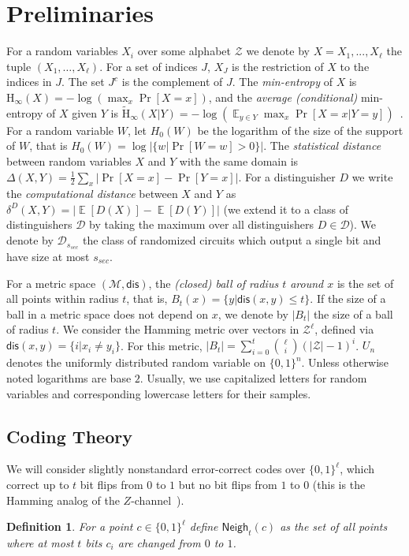 \documentclass[11pt]{article}
\DeclareMathOperator*{\expe}{\mathbb{E}}
\newcommand{\class}[1]{{\ensuremath{\mathsf{#1}}}}
\newcommand{\zo}{\ensuremath{\{0, 1\}}}
\newcommand{\neigh}{\ensuremath{\class{Neigh}}\xspace}
\newcommand{\dis}{\ensuremath{\mathsf{dis}}}
\newcommand{\Hoo}{\mathrm{H}_\infty}
\newcommand{\Hav}{\tilde{\mathrm{H}}_\infty}
\newtheorem{definition}[theorem]{Definition}
\begin{document}
\section{Preliminaries}
\label{sec:preliminaries}
For a random variables $X_i$ over some alphabet $\mathcal{Z}$ we denote by $X = X_1,..., X_\ell$  the tuple $(X_1,\dots, X_\ell)$.  For a set of indices $J$, $X_{J}$ is the restriction of $X$ to the indices in $J$.  The set $J^c$ is the complement of $J$.  The {\em min-entropy} of $X$ is $\Hoo(X) = -\log(\max_x \Pr[X=x])$,
and the {\em average (conditional)} min-entropy of $X$ given $Y$ is  $\Hav(X|Y) = -\log(\expe_{y\in Y} \max_{x} \Pr[X=x|Y=y])$~\cite[Section 2.4]{DBLP:journals/siamcomp/DodisORS08}.   For a random variable $W$, let $H_0(W)$ be the logarithm of the size of the support of $W$,  that is $H_0(W) = \log |\{w | \Pr[W=w]>0\}|$.
The {\em statistical distance} between random variables $X$ and $Y$ with the same domain is $\Delta(X,Y) = \frac12 \sum_x |\Pr[X=x] - \Pr[Y=x]|$.
For a distinguisher $D$ we write the \emph{computational distance} between $X$ and $Y$ as $\delta^D(X,Y) = \left| \expe[D(X)]-\expe[D(Y)]\right |$ (we extend it to a class of distinguishers $\mathcal{D}$ by taking the maximum over all distinguishers $D\in\mathcal{D}$).  We denote by $\mathcal{D}_{s_{sec}}$ the class of randomized circuits which output a single bit and have size at most $s_{sec}$.

For a metric space $(\mathcal{M}, \dis)$, the \emph{(closed) ball of radius $t$ around $x$} is the set of all points within radius $t$, that is, $B_t(x) = \{y| \dis(x, y)\leq t\}$.  If the size of a ball in a metric space does not depend on $x$, we denote by $|B_t|$ the size of a ball of radius $t$.  We consider the Hamming metric over vectors in $\mathcal{Z}^\ell$, defined via $\dis(x,y) = \{i | x_i \neq y_i\}$.  For this metric, $|B_t| = \sum_{i=0}^t {\ell \choose i} (|\mathcal{Z}|-1)^i $.  $U_n$ denotes the uniformly  distributed random variable on $\{0,1\}^n$.  Unless otherwise noted logarithms are base $2$.
Usually, we use capitalized letters for random variables and corresponding lowercase letters for their samples.

\subsection{Coding Theory}
\label{sec:coding theory}
We will consider slightly nonstandard error-correct codes over $\{0,1\}^\ell$, which correct up to $t$ bit flips from $0$ to $1$ but no bit flips from $1$ to $0$ (this is the Hamming analog of the $Z$-channel~\cite{tallini2002capacity}).
\begin{definition}
\label{def:hamming z channel}
For a point $c\in \zo^\ell$ define $\neigh_t(c) $ as the set of all points where at most $t$ bits $c_i$ are changed from $0$ to $1$.
\end{definition}
\end{document}
